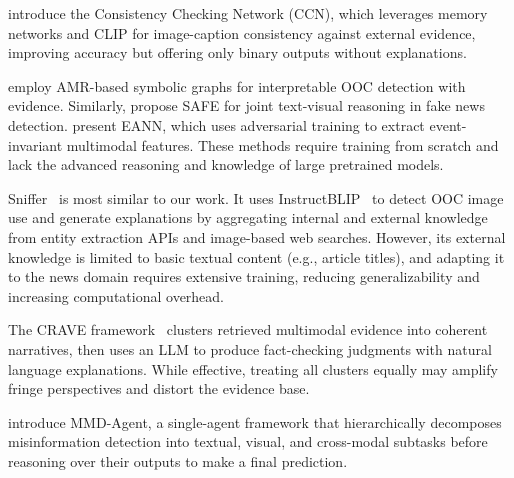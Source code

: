 \documentclass{article}
\theoremstyle{plain}
\theoremstyle{definition}
\theoremstyle{remark}
\begin{document}
\citet{abdelnabi2022opendomaincontentbasedmultimodalfactchecking} introduce the Consistency Checking Network (CCN), which leverages memory networks and CLIP for image-caption consistency against external evidence, improving accuracy but offering only binary outputs without explanations.

\citet{zhang2024interpretabledetectionoutofcontextmisinformation} employ AMR-based symbolic graphs for interpretable OOC detection with evidence. Similarly, \citet{zhou2020safesimilarityawaremultimodalfake} propose SAFE for joint text-visual reasoning in fake news detection. \citet{eann} present EANN, which uses adversarial training to extract event-invariant multimodal features. These methods require training from scratch and lack the advanced reasoning and knowledge of large pretrained models.




Sniffer~\citep{qi2024sniffermultimodallargelanguage} is most similar to our work. It uses InstructBLIP~\citep{dai2023instructblipgeneralpurposevisionlanguagemodels} to detect OOC image use and generate explanations by aggregating internal and external knowledge from entity extraction APIs and image-based web searches. However, its external knowledge is limited to basic textual content (e.g., article titles), and adapting it to the news domain requires extensive training, reducing generalizability and increasing computational overhead.

The CRAVE framework~\citep{crave} clusters retrieved multimodal evidence into coherent narratives, then uses an LLM to produce fact-checking judgments with natural language explanations. While effective, treating all clusters equally may amplify fringe perspectives and distort the evidence base.

\citet{mmfakebench} introduce MMD-Agent, a single-agent framework that hierarchically decomposes misinformation detection into textual, visual, and cross-modal subtasks before reasoning over their outputs to make a final prediction.
\end{document}
